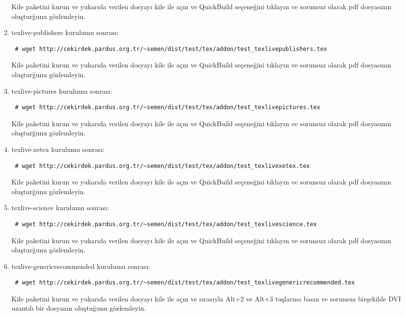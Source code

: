 \documentclass[a4paper,10pt]{article}
\begin{document}
\begin{enumerate}
Kile paketini kurun ve yukarıda verilen dosyayı kile ile açın ve QuickBuild  seçeneğini tıklayın ve sorunsuz olarak pdf dosyasının oluşturğunu gözlemleyin.
\item texlive-publishers kurulumu sonrası:
\begin{verbatim}
 # wget http://cekirdek.pardus.org.tr/~semen/dist/test/tex/addon/test_texlivepublishers.tex
\end{verbatim}

Kile paketini kurun ve yukarıda verilen dosyayı kile ile açın ve QuickBuild  seçeneğini tıklayın ve sorunsuz olarak pdf dosyasının oluşturğunu gözlemleyin.

\item texlive-pictures kurulumu sonrası:
\begin{verbatim}
 # wget http://cekirdek.pardus.org.tr/~semen/dist/test/tex/addon/test_texlivepictures.tex
\end{verbatim}

Kile paketini kurun ve yukarıda verilen dosyayı kile ile açın ve QuickBuild  seçeneğini tıklayın ve sorunsuz olarak pdf dosyasının oluşturğunu gözlemleyin.

\item texlive-xetex kurulumu sonrası:
\begin{verbatim}
 # wget http://cekirdek.pardus.org.tr/~semen/dist/test/tex/addon/test_texlivexetex.tex
\end{verbatim}

Kile paketini kurun ve yukarıda verilen dosyayı kile ile açın ve QuickBuild  seçeneğini tıklayın ve sorunsuz olarak pdf dosyasının oluşturğunu gözlemleyin.
\item texlive-science kurulumu sonrası:
\begin{verbatim}
 # wget http://cekirdek.pardus.org.tr/~semen/dist/test/tex/addon/test_texlivescience.tex
\end{verbatim}

Kile paketini kurun ve yukarıda verilen dosyayı kile ile açın ve QuickBuild  seçeneğini tıklayın ve sorunsuz olarak pdf dosyasının oluşturğunu gözlemleyin.

\item texlive-genericrecommended kurulumu sonrası:
\begin{verbatim}
 # wget http://cekirdek.pardus.org.tr/~semen/dist/test/tex/addon/test_texlivegenericrecommended.tex
\end{verbatim}

Kile paketini kurun ve yukarıda verilen dosyayı kile ile açın ve sırasıyla Alt+2 ve Alt+3 tuşlarına basın ve sorunsuz birşekilde DVI uzantılı bir dosyanın oluştuğunu gözlemleyin.


\end{enumerate}
\end{document}
